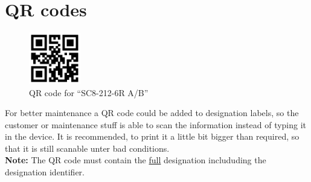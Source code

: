 %
%
%
%
%
%
%

\section{QR codes}

\begin{figure}
	\centering
	\includegraphics[width=0.20\textwidth]{qr.eps}

	\caption{QR code for ``SC8-212-6R A/B''}
\end{figure}

For better maintenance a QR code could be added to designation labels, so the
customer or maintenance stuff is able to scan the information instead of typing
it in the device. It is recommended, to print it a little bit bigger than
required, so that it is still scanable unter bad conditions. \\

\textbf{Note:} The QR code must contain the \underline{full} designation
includuding the designation identifier.
